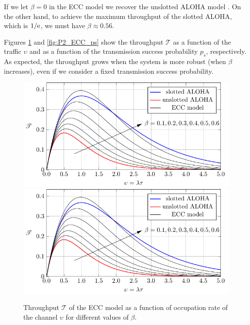 If we let $\beta = 0$ in the ECC model we recover the unslotted ALOHA model \cite{abramson1970aloha}.
%
On the other hand, to achieve the maximum throughput of the slotted ALOHA, which is $1/\mathrm{e}$, we must have $\beta \approx 0.56$.

Figures \ref{fig:P2_ECC} and \ref{fig:P2_ECC_ps} show the throughput $\mathscr{T}$ as a function of the traffic $\upsilon$ and as a function of the transmission success probability $p_s$, respectively.
%
As expected, the throughput grows when the system is more robust (when $\beta$ increases), even if we consider a fixed transmission success probability.

\begin{figure}[htb]
    \centering
    \if{}
        \includegraphics[]{Figures/Ch5_ECC.pdf}
    \else
        \includegraphics[draft, width=\textwidth]{Figures/Ch5_ECC.pdf}
    \fi
    \caption{Throughput $\mathscr{T}$ of the ECC model as a function of occupation rate of the channel $\upsilon$ for different values of $\beta$.}
    \label{fig:P2_ECC}
\end{figure}%
%
